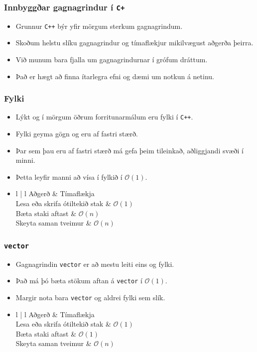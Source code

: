 \documentclass[handout]{beamer}
\newcommand\env[2]
{
	\begin{#1}
	#2
	\end{#1}
}
\begin{document}
\env{frame}
{
	\frametitle{Innbyggðar gagnagrindur í \texttt{C+}}
	\env{itemize}
	{
		\item<1-> Grunnur \texttt{C++} býr yfir mörgum sterkum gagnagrindum.
		\item<2-> Skoðum helstu slíku gagnagrindur og tímaflækjur mikilvægust aðgerða þeirra.
		\item<3-> Við munum bara fjalla um gagnagrindurnar í grófum dráttum.
		\item<4-> Það er hægt að finna ítarlegra efni og dæmi um notkun á netinu.
	}
}

\env{frame}
{
	\frametitle{Fylki}
	\env{itemize}
	{
		\item<1-> Lýkt og í mörgum öðrum forritunarmálum eru fylki í \texttt{C++}.
		\item<2-> Fylki geyma gögn og eru af fastri stærð.
		\item<3-> Þar sem þau eru af fastri stærð má gefa þeim tileinkað, aðliggjandi svæði í minni.
		\item<4-> Þetta leyfir manni að vísa í fylkið í $\mathcal{O}(1)$.
		\item<5->
		\env{tabular}
		{
			{l | l}
			Aðgerð & Tímaflækja\\
			\hline
			Lesa eða skrifa ótiltekið stak & $\mathcal{O}(1)$\\
			Bæta staki aftast & $\mathcal{O}(n)$\\
			Skeyta saman tveimur & $\mathcal{O}(n)$\\
		}
	}
}

\env{frame}
{
	\frametitle{\texttt{vector}}
	\env{itemize}
	{
		\item<1-> Gagnagrindin \texttt{vector} er að mestu leiti eins og fylki.
		\item<2-> Það má þó bæta stökum aftan á \texttt{vector} í $\mathcal{O}(1)$.
		\item<3-> Margir nota bara \texttt{vector} og aldrei fylki sem slík.
		\item<4->
		\env{tabular}
		{
			{l | l}
			Aðgerð & Tímaflækja\\
			\hline
			Lesa eða skrifa ótiltekið stak & $\mathcal{O}(1)$\\
			Bæta staki aftast & $\mathcal{O}(1)$\\
			Skeyta saman tveimur & $\mathcal{O}(n)$\\
		}
	}
}
\end{document}
